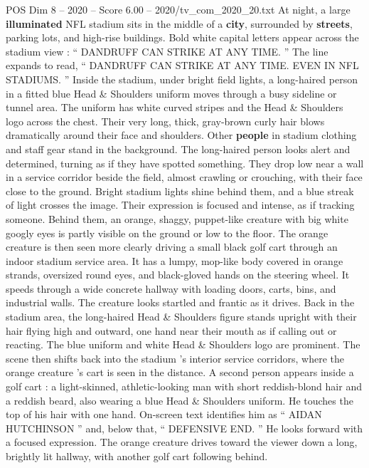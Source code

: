 \begin{textsample}{POS Dim 8 – 2020 – Score 6.00 – 2020/tv\_com\_2020\_20.txt}  \label{ex:f8_pos_056}
At night, a large \textbf{illuminated} NFL stadium sits in the middle of a \textbf{city}, surrounded by \textbf{streets}, parking lots, and high-rise buildings.
Bold white capital letters appear across the stadium view : “ DANDRUFF CAN STRIKE AT ANY TIME. ” The line expands to read, “ DANDRUFF CAN STRIKE AT ANY TIME.
EVEN IN NFL STADIUMS. ” Inside the stadium, under bright field lights, a long-haired person in a fitted blue Head \& Shoulders uniform moves through a busy sideline or tunnel area.
The uniform has white curved stripes and the Head \& Shoulders logo across the chest.
Their very long, thick, gray-brown curly hair blows dramatically around their face and shoulders.
Other \textbf{people} in stadium clothing and staff gear stand in the background.
The long-haired person looks alert and determined, turning as if they have spotted something.
They drop low near a wall in a service corridor beside the field, almost crawling or crouching, with their face close to the ground.
Bright stadium lights shine behind them, and a blue streak of light crosses the image.
Their expression is focused and intense, as if tracking someone.
Behind them, an orange, shaggy, puppet-like creature with big white googly eyes is partly visible on the ground or low to the floor.
The orange creature is then seen more clearly driving a small black golf cart through an indoor stadium service area.
It has a lumpy, mop-like body covered in orange strands, oversized round eyes, and black-gloved hands on the steering wheel.
It speeds through a wide concrete hallway with loading doors, carts, bins, and industrial walls.
The creature looks startled and frantic as it drives.
Back in the stadium area, the long-haired Head \& Shoulders figure stands upright with their hair flying high and outward, one hand near their mouth as if calling out or reacting.
The blue uniform and white Head \& Shoulders logo are prominent.
The scene then shifts back into the stadium ’s interior service corridors, where the orange creature ’s cart is seen in the distance.
A second person appears inside a golf cart : a light-skinned, athletic-looking man with short reddish-blond hair and a reddish beard, also wearing a blue Head \& Shoulders uniform.
He touches the top of his hair with one hand.
On-screen text identifies him as “ AIDAN HUTCHINSON ” and, below that, “ DEFENSIVE END. ” He looks forward with a focused expression.
The orange creature drives toward the viewer down a long, brightly lit hallway, with another golf cart following behind.

\end{textsample}
